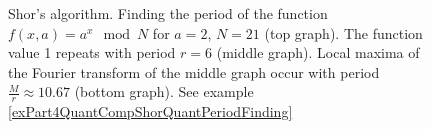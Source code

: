 \begin{figure}
\centering








\caption{Shor's algorithm. Finding the period of the function 
  $f\left(x, a\right) = a^x \mod{N}$ for $a=2$, $N = 21$ (top graph). 
  The function value 1 repeats with period $r=6$ (middle graph). 
  Local maxima of the Fourier transform of the middle graph 
  occur with period $\frac{M}{r} \approx 10.67$ (bottom graph). See
  example \ref{exPart4QuantCompShorQuantPeriodFinding}}
\label{picPart4QuantCompShorQuantPart}
\end{figure}